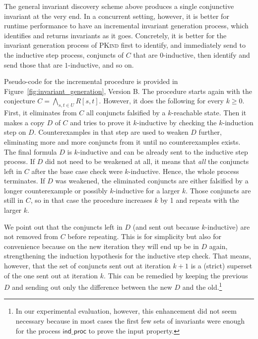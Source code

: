 \documentclass[submission,copyright,creativecommons]{eptcs}
\newcommand{\PKind}{\textrm{\textsc{PKind}}\xspace}
\begin{document}
The general invariant discovery scheme above produces a
single conjunctive invariant at the very end.
In a concurrent setting, however, it is better for runtime performance 
to have an incremental invariant generation process, 
which identifies and returns invariants as it goes.
Concretely, it is better for the invariant generation process of \PKind
first to identify, and immediately send to the inductive step process,
conjuncts of $C$ that are $0$-inductive, then identify and send
those that are $1$-inductive, and so on.

Pseudo-code for the incremental procedure is provided 
in Figure~\ref{fig:invariant_generation}, Version B.
The procedure starts again with the conjecture
$C = \bigwedge_{s,t\in U} R[s,t]$.
However, it does the following for every $k \geq 0$.
First, it eliminates from $C$ all conjuncts falsified by a $k$-reachable state. 
Then it makes a copy $D$ of $C$ and tries to prove it $k$-inductive
by checking the $k$-induction step on $D$.
Counterexamples in that step are used to weaken $D$ further,
eliminating more and more conjuncts from it 
until no counterexamples exists. 
The final formula $D$ is $k$-inductive and can be already sent
to the inductive step process.
If $D$ did not need to be weakened at all, it means that 
\emph{all} the conjuncts left in $C$ after the base case check 
were $k$-inductive.
Hence, the whole process terminates.
If $D$ was weakened, the eliminated conjuncts 
are either falsified by a longer counterexample or 
possibly $k$-inductive for a larger $k$.
Those conjuncts are still in $C$, so in that case 
the procedure increases $k$ by 1 and repeats with the larger $k$.

We point out that 
the conjuncts left in $D$ (and sent out because $k$-inductive) are
not removed from $C$ before repeating.
This is for simplicity but also for convenience 
because on the new iteration they will end up be in $D$ again,
strengthening the induction hypothesis for the inductive step check.
That means, however, that the set of conjuncts sent out 
at iteration $k+1$ is a (strict) superset of the one sent out at
iteration $k$. 
This can be remedied by keeping the previous $D$ and
sending out only the difference between the new $D$ and the old.\footnote{
In our experimental evaluation, however, this enhancement 
did not seem necessary 
because in most cases the first few sets of invariants were 
enough for the process $\mathsf{ind\_proc}$ to prove 
the input property.
}


\vspace{-0.4cm}
\end{document}
